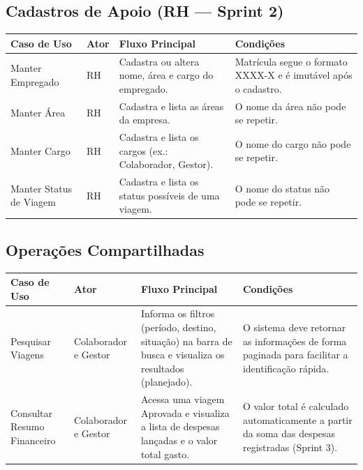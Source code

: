 \documentclass[12pt,article,oneside,a4paper]{abntex2}
\begin{document}
\bigskip

\subsection{Cadastros de Apoio (RH --- Sprint 2)}

\begin{xltabular}{\textwidth}{|Y|l|Y|Y|}
\hline
{}
\textbf{Caso de Uso} & \textbf{Ator} & \textbf{Fluxo Principal} & \textbf{Condições} \\
\hline
\endhead
Manter Empregado & RH & Cadastra ou altera nome, área e cargo do empregado. & Matrícula segue o formato XXXX-X e é imutável após o cadastro. \\
\hline
Manter Área & RH & Cadastra e lista as áreas da empresa. & O nome da área não pode se repetir. \\
\hline
Manter Cargo & RH & Cadastra e lista os cargos (ex.: Colaborador, Gestor). & O nome do cargo não pode se repetir. \\
\hline
Manter Status de Viagem & RH & Cadastra e lista os status possíveis de uma viagem. & O nome do status não pode se repetir. \\
\hline
\end{xltabular}

\bigskip

\subsection{Operações Compartilhadas}

\begin{xltabular}{\textwidth}{|Y|l|Y|Y|}
\hline
{}
\textbf{Caso de Uso} & \textbf{Ator} & \textbf{Fluxo Principal} & \textbf{Condições} \\
\hline
\endhead
Pesquisar Viagens & Colaborador e Gestor & Informa os filtros (período, destino, situação) na barra de busca e visualiza os resultados (planejado). & O sistema deve retornar as informações de forma paginada para facilitar a identificação rápida. \\
\hline
Consultar Resumo Financeiro & Colaborador e Gestor & Acessa uma viagem Aprovada e visualiza a lista de despesas lançadas e o valor total gasto. & O valor total é calculado automaticamente a partir da soma das despesas registradas (Sprint 3). \\
\hline
\end{xltabular}

\bigskip

\end{document}
